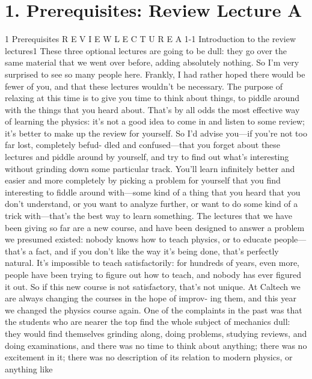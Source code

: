 \documentclass[10pt,oneside]{article}
\begin{document}
\section*{1. Prerequisites: Review Lecture A}
\label{tips-sec-9-1-prerequisites-review-lecture-a}
1 Prerequisites R E V I E W  L E C T U R E  A 1-1 Introduction to the review lectures1 These three optional lectures are going to be dull: they go over the same material that we went over before, adding absolutely nothing. So I’m very surprised to see so many people here. Frankly, I had rather hoped there would be fewer of you, and that these lectures wouldn’t be necessary. The purpose of relaxing at this time is to give you time to think about things, to piddle around with the things that you heard about. That’s by all odds the most effective way of learning the physics: it’s not a good idea to come in and listen to some review; it’s better to make up the review for yourself. So I’d advise you---if you’re not too far lost, completely befud- dled and confused---that you forget about these lectures and piddle around by yourself, and try to find out what’s interesting without grinding down some particular track. You’ll learn infinitely better and easier and more completely by picking a problem for yourself that you find interesting to fiddle around with---some kind of a thing that you heard that you don’t understand, or you want to analyze further, or want to do some kind of a trick with---that’s the best way to learn something. The lectures that we have been giving so far are a new course, and have been designed to answer a problem we presumed existed: nobody knows how to teach physics, or to educate people---that’s a fact, and if you don’t like the way it’s being done, that’s perfectly natural. It’s impossible to teach satisfactorily: for hundreds of years, even more, people have been trying to figure out how to teach, and nobody has ever figured it out. So if this new course is not satisfactory, that’s not unique. At Caltech we are always changing the courses in the hope of improv- ing them, and this year we changed the physics course again. One of the complaints in the past was that the students who are nearer the top find the whole subject of mechanics dull: they would find themselves grinding along, doing problems, studying reviews, and doing examinations, and there was no time to think about anything; there was no excitement in it; there was no description of its relation to modern physics, or anything like\par
\end{document}
